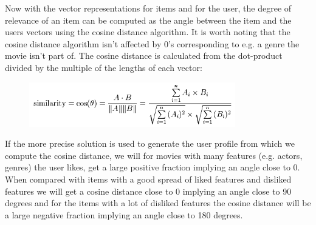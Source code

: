 Now with the vector representations for items and for the user, the degree of relevance of an item can be computed as the angle between the item and the users vectors using the cosine distance algorithm. It is worth noting that the cosine distance algorithm isn't affected by 0's corresponding to e.g. a genre the movie isn't part of. The cosine distance is calculated from the dot-product divided by the multiple of the lengths of each vector:

\begin{figure}[H]
\centering
\includegraphics[width=0.8\textwidth]{Images/Cosinesimularity.png}
\caption{}
\label{Cosine}
\end{figure}

If the more precise solution is used to generate the user profile from which we compute the cosine distance, we will for movies with many features (e.g. actors, genres) the user likes, get a large positive fraction implying an angle close to 0. When compared with items with a good spread of liked features and disliked features we will get a cosine distance close to 0 implying an angle close to 90 degrees and for the items with a lot of disliked features the cosine distance will be a large negative fraction implying an angle close to 180 degrees.


